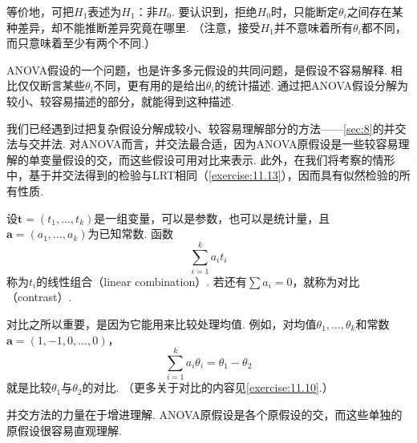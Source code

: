 等价地，可把$H_1$表述为$H_1$：非$H_0$. 要认识到，拒绝$H_0$时，只能断定$\theta_i$之间存在某种差异，却不能推断差异究竟在哪里. （注意，接受$H_1$并不意味着所有$\theta_i$都不同，而只意味着至少有两个不同.）

ANOVA假设的一个问题，也是许多多元假设的共同问题，是假设不容易解释. 相比仅仅断言某些$\theta_i$不同，更有用的是给出$\theta_i$的统计描述. 通过把ANOVA假设分解为较小、较容易描述的部分，就能得到这种描述.

我们已经遇到过把复杂假设分解成较小、较容易理解部分的方法——\autoref{sec:8}的并交法与交并法. 对ANOVA而言，并交法最合适，因为ANOVA原假设是一些较容易理解的单变量假设的交，而这些假设可用对比来表示. 此外，在我们将考察的情形中，基于并交法得到的检验与LRT相同（\autoref{exercise:11.13}），因而具有似然检验的所有性质.

\begin{definition}\label{def:11.2.4}
设$\boldsymbol t=(t_1,\ldots,t_k)$是一组变量，可以是参数，也可以是统计量，且$\boldsymbol a=(a_1,\ldots,a_k)$为已知常数. 函数
\begin{equation}\label{eq:11.2.4}
\sum_{i=1}^k a_it_i
\end{equation}
称为$t_i$的线性组合（linear combination）. 若还有$\sum a_i=0$，就称为对比（contrast）.
\end{definition}

对比之所以重要，是因为它能用来比较处理均值. 例如，对均值$\theta_1,\ldots,\theta_k$和常数$\boldsymbol a=(1,-1,0,\ldots,0)$，
$$\sum_{i=1}^k a_i\theta_i=\theta_1-\theta_2$$
就是比较$\theta_1$与$\theta_2$的对比. （更多关于对比的内容见\autoref{exercise:11.10}.）

并交方法的力量在于增进理解. ANOVA原假设是各个原假设的交，而这些单独的原假设很容易直观理解.

